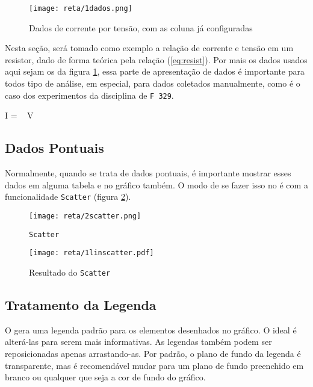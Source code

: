 \begin{figure}[htbp]
    \centering
    \texttt{[image: reta/1dados.png]}

    \caption{Dados de corrente por tensão, com as coluna já configuradas}
    \label{fig:reta:dados}
\end{figure}

Nesta seção, será tomado como exemplo a relação de corrente e tensão em um resistor, dado de forma teórica pela relação (\ref{eq:resist}). Por mais os dados usados aqui sejam os da figura \ref{fig:reta:dados}, essa parte de apresentação de dados é importante para todos tipo de análise, em especial, para dados coletados manualmente, como é o caso dos experimentos da disciplina de \texttt{F 329}.

\begin{equacao} \label{eq:resist}
    I =  ~ V
\end{equacao}


\subsection{Dados Pontuais}

    Normalmente, quando se trata de dados pontuais, é importante mostrar esses dados em alguma tabela e no gráfico também. O modo de se fazer isso no \software é com a funcionalidade \texttt{Scatter} (figura \ref{fig:reta:scatter}).

    \begin{figure}[htbp]
        \centering
        \texttt{[image: reta/2scatter.png]}

        \caption{\texttt{Scatter}}
        \label{fig:reta:scatter}
    \end{figure}

    \begin{figure}[htbp]
        \centering
        \texttt{[image: reta/1linscatter.pdf]}

        \caption{Resultado do \texttt{Scatter}}
        \label{fig:reta:linscatter}
    \end{figure}


\subsection{Tratamento da Legenda}

    O \software gera uma legenda padrão para os elementos desenhados no gráfico. O ideal é alterá-las para serem mais informativas. As legendas também podem ser reposicionadas apenas arrastando-as. Por padrão, o plano de fundo da legenda é transparente, mas é recomendável mudar para um plano de fundo preenchido em branco ou qualquer que seja a cor de fundo do gráfico.


